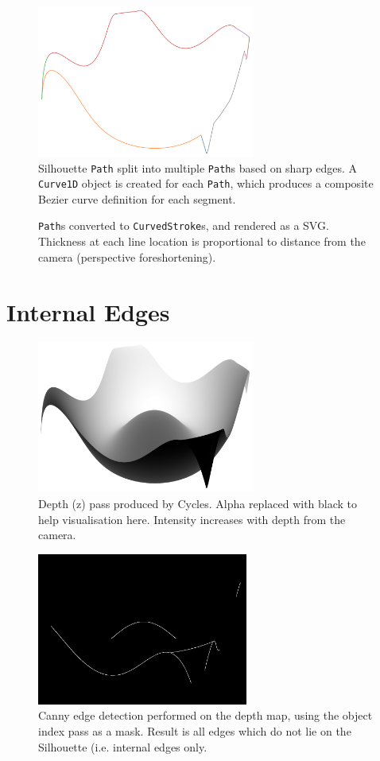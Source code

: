 \begin{figure}[h!]
	\centering
	\includegraphics[height=5cm]{images/sil_split_paths.png}
	\caption{Silhouette \texttt{Path} split into multiple \texttt{Path}s based on sharp edges. A \texttt{Curve1D} object is created for each \texttt{Path}, which produces a composite Bezier curve definition for each segment.}\label{sil_split_paths}
\end{figure}

\begin{figure}[h!]
	\centering
	
	\caption{\texttt{Path}s converted to \texttt{CurvedStroke}s, and rendered as a SVG. Thickness at each line location is proportional to distance from the camera (perspective foreshortening).}\label{sil_obj}
\end{figure}

\FloatBarrier
\section{Internal Edges}
\begin{figure}[h!]
	\centering
	\includegraphics[height=5cm]{images/int_depth.png}
	\caption{Depth (z) pass produced by Cycles. Alpha replaced with black to help visualisation here. Intensity increases with depth from the camera.}\label{int_depth}
\end{figure}

\begin{figure}[h!]
	\centering
	\includegraphics[height=5cm]{images/int_edge.png}
	\caption{Canny edge detection performed on the depth map, using the object index pass as a mask. Result is all edges which do not lie on the Silhouette (i.e. internal edges only.}\label{int_edge}
\end{figure}

